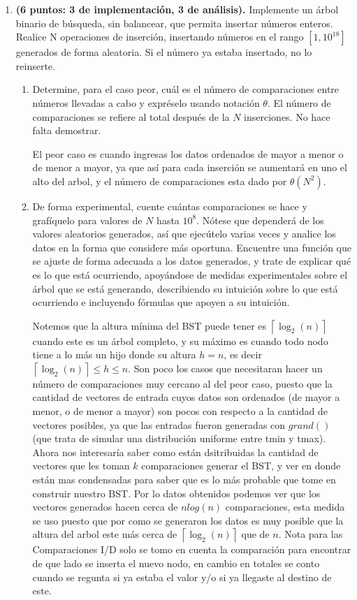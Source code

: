 \documentclass[letterpaper]{article}
\theoremstyle{definition}
\theoremstyle{lemathm}
\theoremstyle{lemathm}
\theoremstyle{lemathm}
\theoremstyle{lemademthm}
\newcommand{\bracs}[1]{\left[ #1 \right] }
\newcommand{\ceil}[1]{\left \lceil #1 \right\rceil }
\newcommand{\1}{\mathbbm{1}}
\begin{document}
\begin{enumerate}[label=\textbf{Problema \arabic*}]
		\newpage

		\item  \textbf{(6 puntos: 3 de implementación, 3 de análisis).} Implemente un árbol binario de búsqueda, sin balancear, que permita insertar números enteros. Realice N operaciones de inserción, insertando números en el rango $\bracs{1, 10^{18}}$ generados de forma aleatoria. Si el número ya estaba insertado, no lo reinserte.
		
		\begin{enumerate}
			\item Determine, para el caso peor, cuál es el número de comparaciones entre números llevadas a cabo y expréselo usando notación $\theta$. El número de comparaciones se refiere al total después de la $N$ inserciones. No hace falta demostrar.
			
			El peor caso es cuando ingresas los datos ordenados de mayor a menor o de menor a mayor, ya que así para cada inserción se aumentará en uno el alto del arbol, y el número de comparaciones esta dado por $\theta(N^2)$.

			\item De forma experimental, cuente cuántas comparaciones se hace y grafíquelo para valores de $N$ hasta $10^{8}$. Nótese que dependerá de los valores aleatorios generados, así que ejecútelo varias veces y analice los datos en la forma que considere más oportuna. Encuentre una función que se ajuste de forma adecuada a los datos generados, y trate de explicar qué es lo que está ocurriendo, apoyándose de medidas experimentales sobre el árbol que se está generando, describiendo su intuición sobre lo que está ocurriendo e incluyendo fórmulas que apoyen a su intuición.
			
			Notemos que la altura mínima del BST puede tener es $\ceil{\log_2(n)}$ cuando este es un árbol completo, y su máximo es cuando todo nodo tiene a lo más un hijo donde su altura $h = n$, es decir $\ceil{\log_2(n)} \leq h \leq n$. Son poco los casos que necesitaran hacer un número de comparaciones muy cercano al del peor caso, puesto que la cantidad de vectores de entrada cuyos datos son ordenados (de mayor a menor, o de menor a mayor) son pocos con respecto a la cantidad de vectores posibles, ya que las entradas fueron generadas con $grand()$ (que trata de simular una distribución uniforme entre tmin y tmax). Ahora nos interesaría saber como están dsitribuidas la cantidad de vectores que les toman $k$ comparaciones generar el BST, y ver en donde están mas condensadas para saber que es lo más probable que tome en construir nuestro BST. Por lo datos obtenidos podemos ver que los vectores generados hacen cerca de $nlog(n)$ comparaciones, esta medida se uso puesto que por como se generaron los datos es muy posible que la altura del arbol este más cerca de $\ceil{\log_2(n)}$ que de $n$. Nota para las Comparaciones I/D solo se tomo en cuenta la comparación para encontrar de que lado se inserta el nuevo nodo, en cambio en totales se conto cuando se regunta si ya estaba el valor y/o si ya llegaste al destino de este.


\end{enumerate}
\end{enumerate}
\end{document}
